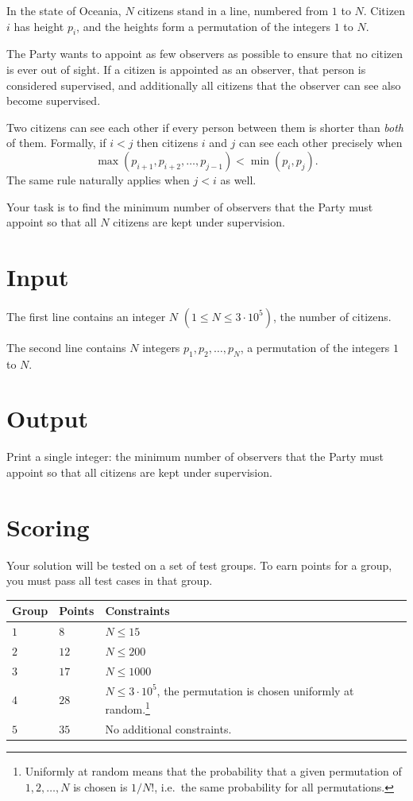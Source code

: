 \noindent

In the state of Oceania, $N$ citizens stand in a line, numbered from $1$ to $N$.
Citizen $i$ has height $p_i$, and the heights form a permutation of the integers $1$ to $N$.

The Party wants to appoint as few observers as possible to ensure that no citizen is ever out of sight.
If a citizen is appointed as an observer, that person is considered supervised, and additionally all citizens that the observer can see also become supervised.

Two citizens can see each other if every person between them is shorter than \emph{both} of them.
Formally, if $i < j$ then citizens $i$ and $j$ can see each other precisely when
\[
\max(p_{i+1}, p_{i+2}, \dots, p_{j-1}) < \min(p_i, p_j).
\]
The same rule naturally applies when $j < i$ as well.

Your task is to find the minimum number of observers that the Party must appoint so that all $N$ citizens are kept under supervision.

\section*{Input}

The first line contains an integer $N$ $(1 \leq N \leq 3 \cdot 10^5)$, the number of citizens.

The second line contains $N$ integers $p_1, p_2, \dots, p_N$, a permutation of the integers $1$ to $N$.

\section*{Output}

Print a single integer: the minimum number of observers that the Party must appoint so that all citizens are kept under supervision.

\section*{Scoring}
Your solution will be tested on a set of test groups.
To earn points for a group, you must pass all test cases in that group.

\noindent
\begin{tabular}{| l | l | p{12cm} |}
  \hline
  \textbf{Group} & \textbf{Points} & \textbf{Constraints} \\ \hline
  $1$ & $8$ & $N \leq 15$ \\ \hline
  $2$ & $12$ & $N \leq 200$ \\ \hline
  $3$ & $17$ & $N \leq 1000$ \\ \hline
  $4$ & $28$ & $N \leq 3 \cdot 10^5$, the permutation is chosen uniformly at random.\footnote{Uniformly at random means that the probability that a given permutation of $1,2,\dots,N$ is chosen is $1/N!$, i.e.\ the same probability for all permutations.}
 \\ \hline
  $5$ & $35$ & No additional constraints. \\ \hline
\end{tabular}

